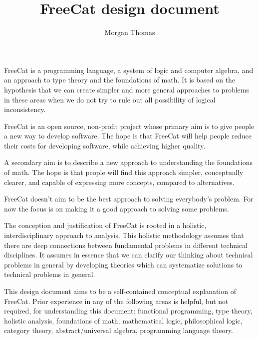 \documentclass{article}
\title{FreeCat design document}
\author{Morgan Thomas}
\begin{document}
\maketitle

FreeCat is a programming language, a system of logic and computer algebra, and an approach to type theory and the foundations of math. It is based on the hypothesis that we can create simpler and more general approaches to problems in these areas when we do not try to rule out all possibility of logical inconsistency.

FreeCat is an open source, non-profit project whose primary aim is to give people a new way to develop software. The hope is that FreeCat will help people reduce their costs for developing software, while achieving higher quality.

A secondary aim is to describe a new approach to understanding the foundations of math. The hope is that people will find this approach simpler, conceptually clearer, and capable of expressing more concepts, compared to alternatives.

FreeCat doesn't aim to be the best approach to solving everybody's problem. For now the focus is on making it a good approach to solving some problems.

The conception and justification of FreeCat is rooted in a holistic, interdisciplinary approach to analysis. This holistic methodology assumes that there are deep connections between fundamental problems in different technical disciplines. It assumes in essence that we can clarify our thinking about technical problems in general by developing theories which can systematize solutions to technical problems in general.

This design document aims to be a self-contained conceptual explanation of FreeCat. Prior experience in any of the following areas is helpful, but not required, for understanding this document: functional programming, type theory, holistic analysis, foundations of math, mathematical logic, philosophical logic, category theory, abstract/universal algebra, programming language theory.
\end{document}
